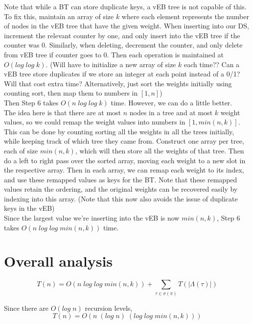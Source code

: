 \documentclass[a4paper]{article}
\begin{document}
    Note that while a BT can store duplicate keys, a vEB tree is not capable of this. To fix this, maintain an array of size $k$ where each element represents the number of nodes in the vEB tree that have the given weight. When inserting into our DS, increment the relevant counter by one, and only insert into the vEB tree if the counter was $0$. Similarly, when deleting, decrement the counter, and only delete from vEB tree if counter goes to $0$. Then each operation is maintained at $O(log\;log\;k)$. (Will have to initialize a new array of size $k$ each time?? Can a vEB tree store duplicates if we store an integer at each point instead of a 0/1? Will that cost extra time? Alternatively, just sort the weights initially using counting sort, then map them to numbers in $[1, n]$)\\

    Then Step 6 takes $O(n\;log\;log\;k)$ time. However, we can do a little better.\\

    The idea here is that there are at most $n$ nodes in a tree and at most $k$ weight values, so we could remap the weight values into numbers in $[1, min(n, k)]$. This can be done by counting sorting all the weights in all the trees initially, while keeping track of which tree they came from. Construct one array per tree, each of size $min(n, k)$, which will then store all the weights of that tree. Then do a left to right pass over the sorted array, moving each weight to a new slot in the respective array. Then in each array, we can remap each weight to its index, and use these remapped values as keys for the BT. Note that these remapped values retain the ordering, and the original weights can be recovered easily by indexing into this array. (Note that this now also avoids the issue of duplicate keys in the vEB)\\

    Since the largest value we're inserting into the vEB is now $min(n, k)$, Step 6 takes $O(n\;log\;log\;min(n, k))$ time.

    \section{Overall analysis}

    \[T(n) = O(n\;log\;log\;min(n, k)) + \sum_{\tau\in\sigma(\pi)}T(|\Lambda(\tau)|)\]

    Since there are $O(log\;n)$ recursion levels,
    \[T(n) = O(n\;(log\;n)\;(log\;log\;min(n, k)))\]
\end{document}
